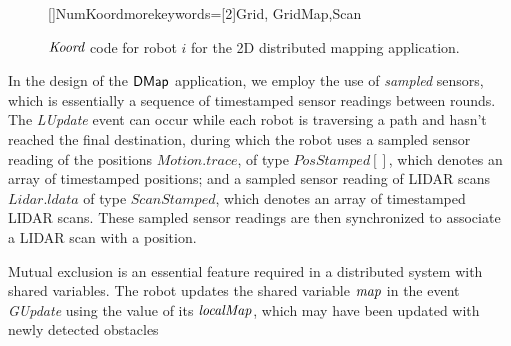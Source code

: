 \begin{figure}[!htbp]
    \noindent
    \begin{center}
        []{NumKoord}{morekeywords=[2]{Grid, GridMap,Scan}}
    \end{center}
    \caption{$\emph{Koord}$ code for robot $i$ for the 2D distributed mapping application.}
    \label{fig:mapapp}
\end{figure}

In the design of the ${\sf DMap}$ application, we employ the use of \emph{sampled} sensors, which is essentially a sequence of timestamped sensor readings between rounds. The \emph{LUpdate} event can occur while each robot is traversing a path and hasn't reached the final destination, during which the robot uses a sampled sensor reading of the positions $\mathit{Motion.trace}$, of type $\mathit{PosStamped}[]$, which denotes an array of timestamped positions; and a sampled sensor reading of LIDAR scans $\mathit{Lidar.ldata}$ of type $\mathit{ScanStamped}$, which denotes an array of timestamped LIDAR scans. These sampled sensor readings are then synchronized to associate a LIDAR scan with a position.

Mutual exclusion is an essential feature required in a distributed system with shared variables. The robot updates the shared variable $\mathit{map}$ in the event \emph{GUpdate} using the value of its $\mathit{localMap}$, which may have been updated with newly detected obstacles



